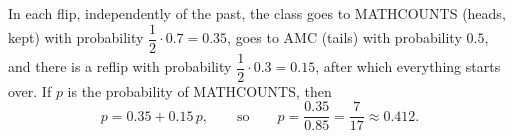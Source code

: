 In each flip, independently of the past, the class goes to MATHCOUNTS (heads, kept) with probability $\dfrac12\cdot0.7=0.35$, goes to AMC (tails) with probability $0.5$, and there is a reflip with probability $\dfrac12\cdot0.3=0.15$, after which everything starts over. If $p$ is the probability of MATHCOUNTS, then
\[p=0.35+0.15\,p,\qquad\text{so}\qquad p=\dfrac{0.35}{0.85}=\boxed{\dfrac{7}{17}}\approx0.412.\]
